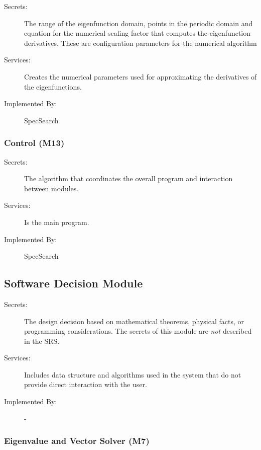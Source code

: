\documentclass[12pt, titlepage]{article}
\begin{document}
	\begin{description}
		\item[Secrets:] The range of the eigenfunction domain, points in the 
		periodic domain and equation for the numerical scaling factor that 
		computes 
		the 
		eigenfunction derivatives. These are configuration parameters for 
		the
		numerical algorithm
		\item[Services:] Creates the numerical parameters used for 
		approximating 
		the derivatives of the eigenfunctions. 
		\item[Implemented By:] SpecSearch
	\end{description} 
	
	\subsubsection{Control (M13)} \label{M13}
	
	\begin{description}
		\item[Secrets:] The algorithm that coordinates the overall program and 
		interaction between modules. 
		\item[Services:] Is the main program.
		\item[Implemented By:] SpecSearch
	\end{description}
	
	\subsection{Software Decision Module}
	
	\begin{description}
		\item[Secrets:] The design decision based on mathematical theorems, 
		physical
		facts, or programming considerations. The secrets of this module are
		\emph{not} described in the SRS.
		\item[Services:] Includes data structure and algorithms used in the 
		system that
		do not provide direct interaction with the user. 
		\item[Implemented By:] -
	\end{description}
	
	\subsubsection{Eigenvalue and Vector Solver (M7)} \label{M7}
	
\end{document}
